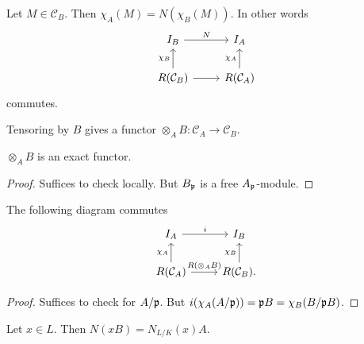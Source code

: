 \documentclass{memoir}
\begin{document}
\begin{proposition}
    Let $M\in \mathcal C_B$. 
    Then $\chi_A(M) = N(\chi_B(M))$.
    In other words
    \begin{equation}
        \begin{tikzcd}
            I_B \arrow[r,"N"] & I_A \\
            R(\mathcal C_B) \arrow[r] \arrow[u,"\chi_B"] & R(\mathcal C_A) \arrow[u,"\chi_A"]
        \end{tikzcd}
    \end{equation}
    commutes.
\end{proposition}
\begin{remark}
    Tensoring by $B$ gives a functor $\otimes_AB: \mathcal C_A\to \mathcal C_B$.
\end{remark}
\begin{proposition}
    $\otimes_AB$ is an exact functor.
\end{proposition}
\begin{proof}
    Suffices to check locally. 
    But $B_{\mathfrak{p}}$ is a free $A_{\mathfrak{p}}$-module.
\end{proof}
\begin{proposition}
    The following diagram commutes
    \begin{equation}
        \begin{tikzcd}
            I_A \arrow[r,"i"] & I_B \\
            R(\mathcal C_A) \arrow[r,"R(\otimes_AB)"] \arrow[u,"\chi_A"] & R(\mathcal C_B). \arrow[u,"\chi_B"]
        \end{tikzcd}
    \end{equation}
\end{proposition}
\begin{proof}
    Suffices to check for $A/\mathfrak{p}$.
    But $i(\chi_A(A/\mathfrak{p})) = \mathfrak{p}B = \chi_B(B/\mathfrak{p}B)$.
\end{proof}
\begin{proposition}
    Let $x\in L$.
    Then $N(xB) = N_{L/K}(x)A$.
\end{proposition}
\end{document}
